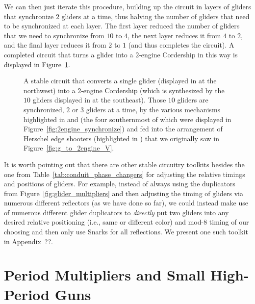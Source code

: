 We can then just iterate this procedure, building up the circuit in layers of gliders that synchronize $2$ gliders at a time, thus halving the number of gliders that need to be synchronized at each layer. The first layer reduced the number of gliders that we need to synchronize from $10$ to $4$, the next layer reduces it from $4$ to $2$, and the final layer reduces it from $2$ to $1$ (and thus completes the circuit). A completed circuit that turns a glider into a $2$-engine Cordership in this way is displayed in Figure~\ref{fig:glider_to_2engine_cordership}.

\begin{figure}[!htb]
	\centering
	\caption{A stable circuit that converts a single glider (displayed in  at the northwest) into a $2$-engine Cordership (which is synthesized by the $10$ gliders displayed in  at the southeast). Those $10$ gliders are synchronized, $2$ or $3$ gliders at a time, by the various mechanisms highlighted in  and  (the four southernmost of which were displayed in Figure~\ref{fig:2engine_synchronize}) and fed into the arrangement of Herschel edge shooters (highlighted in ) that we originally saw in Figure~\ref{fig:g_to_2engine_V}.}\label{fig:glider_to_2engine_cordership}
\end{figure}

It is worth pointing out that there are other stable circuitry toolkits besides the one from Table~\ref{tab:conduit_phase_changers} for adjusting the relative timings and positions of gliders. For example, instead of always using the duplicators from Figure~\ref{fig:glider_multipliers} and then adjusting the timing of gliders via numerous different reflectors (as we have done so far), we could instead make use of numerous different glider duplicators to \emph{directly} put two gliders into any desired relative positioning (i.e., same or different color) and mod-$8$ timing of our choosing and then only use Snarks for all reflections. We present one such toolkit in Appendix~??.



\section{Period Multipliers and Small High-Period Guns}\label{sec:large_glider_guns}

